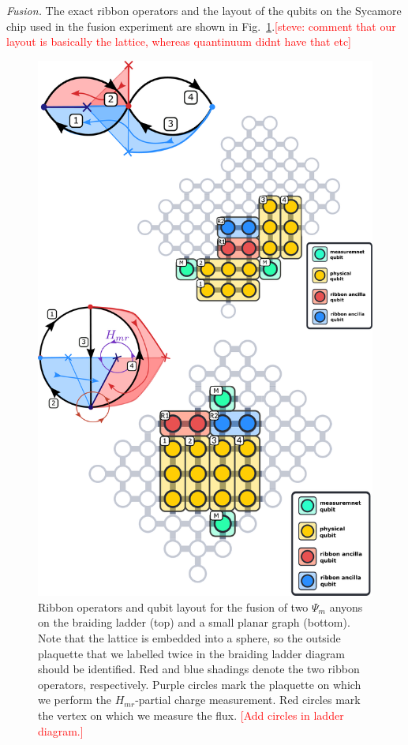 \documentclass[two column]{article}
\newcommand{\caro}[1]{\textcolor{red}{[#1]}}
\begin{document}
\emph{Fusion.} 
The exact ribbon operators and the layout of the qubits on the Sycamore chip used in the fusion experiment are shown in Fig.~\ref{fig:fusion_setup}.\caro{steve: comment that our layout is basically the lattice, whereas quantinuum didnt have that etc}
\begin{figure}
	\centering
	\includegraphics[width=\linewidth]{Figures/basket_fusion.pdf}
	\caption{Ribbon operators and qubit layout for the fusion of two $\Psi_m$ anyons on the braiding ladder (top) and a small planar graph (bottom). Note that the lattice is embedded into a sphere, so the outside plaquette that we labelled twice in the braiding ladder diagram should be identified. Red and blue shadings denote the two ribbon operators, respectively. Purple circles mark the plaquette on which we perform the $H_{mr}$-partial charge measurement. Red circles mark the vertex on which we measure the flux. \caro{Add circles in ladder diagram.}}
	\label{fig:fusion_setup}
\end{figure}
\end{document}
